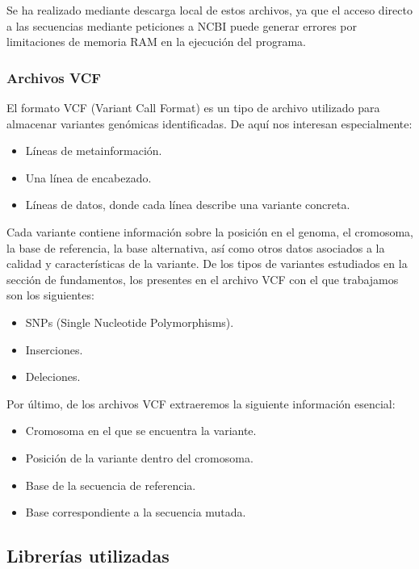 \documentclass[11pt,spanish,listoffigures,listoftables]{tfgetsinf}
\begin{document}
Se ha realizado mediante descarga local de estos archivos, ya que el acceso directo a las secuencias mediante peticiones a \ac{NCBI} puede generar errores por limitaciones de memoria RAM en la ejecución del programa. 

\subsubsection{Archivos VCF}

El formato \ac{VCF} (Variant Call Format) es un tipo de archivo utilizado para almacenar variantes genómicas identificadas. De aquí nos interesan especialmente: 

\begin{itemize}
   \item Líneas de metainformación. 
   \item Una línea de encabezado.
   \item Líneas de datos, donde cada línea describe una variante concreta. 
\end{itemize}

Cada variante contiene información sobre la posición en el genoma, el cromosoma, la base de referencia, la base alternativa, así como otros datos asociados a la calidad y características de la variante. De los tipos de variantes estudiados en la sección de fundamentos, los presentes en el archivo \ac{VCF} con el que trabajamos son los siguientes: 

\begin{itemize}
   \item \ac{SNP}s (Single Nucleotide Polymorphisms). 
   \item Inserciones. 
   \item Deleciones.
\end{itemize}

Por último, de los archivos \ac{VCF} extraeremos la siguiente información esencial: 

\begin{itemize}
   \item Cromosoma en el que se encuentra la variante.
   \item Posición de la variante dentro del cromosoma.  
   \item Base de la secuencia de referencia.
   \item Base correspondiente a la secuencia mutada.
\end{itemize}
 

\subsection{Librerías utilizadas}
\end{document}
